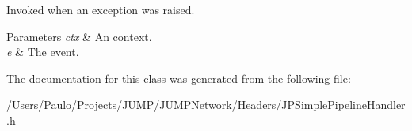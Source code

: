 Invoked when an exception was raised. 


\begin{DoxyParams}{Parameters}
{\em ctx} & An context. \\
\hline
{\em e} & The event. \\
\hline
\end{DoxyParams}


The documentation for this class was generated from the following file:\begin{DoxyCompactItemize}
\item 
/Users/Paulo/Projects/JUMP/JUMPNetwork/Headers/JPSimplePipelineHandler.h\end{DoxyCompactItemize}
